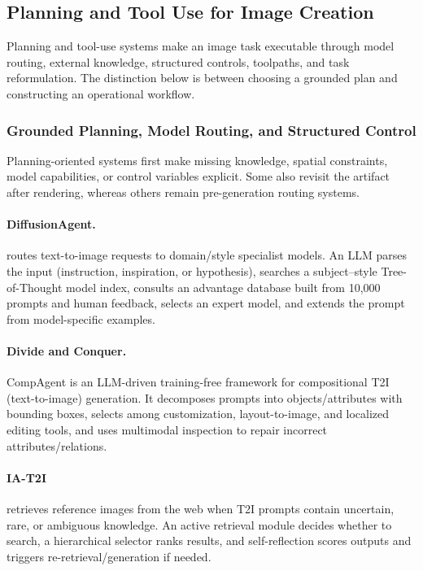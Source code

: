 \subsection{Planning and Tool Use for Image Creation}
Planning and tool-use systems make an image task executable through model routing, external knowledge, structured controls, toolpaths, and task reformulation. The distinction below is between choosing a grounded plan and constructing an operational workflow.

\subsubsection{Grounded Planning, Model Routing, and Structured Control}
Planning-oriented systems first make missing knowledge, spatial constraints, model capabilities, or control variables explicit. Some also revisit the artifact after rendering, whereas others remain pre-generation routing systems.

\paragraph{DiffusionAgent.}
 routes text-to-image requests to domain/style specialist models. An LLM parses the input (instruction, inspiration, or hypothesis), searches a subject–style Tree-of-Thought model index, consults an advantage database built from 10,000 prompts and human feedback, selects an expert model, and extends the prompt from model-specific examples. ~\cite{qin2024diffusionagent}

\paragraph{Divide and Conquer.}
CompAgent is an LLM-driven training-free framework for compositional T2I (text-to-image) generation. It decomposes prompts into objects/attributes with bounding boxes, selects among customization, layout-to-image, and localized editing tools, and uses multimodal inspection to repair incorrect attributes/relations. ~\cite{wang2024divide}

\paragraph{IA-T2I}
 retrieves reference images from the web when T2I prompts contain uncertain, rare, or ambiguous knowledge. An active retrieval module decides whether to search, a hierarchical selector ranks results, and self-reflection scores outputs and triggers re-retrieval/generation if needed. ~\cite{li2025iat2i}

